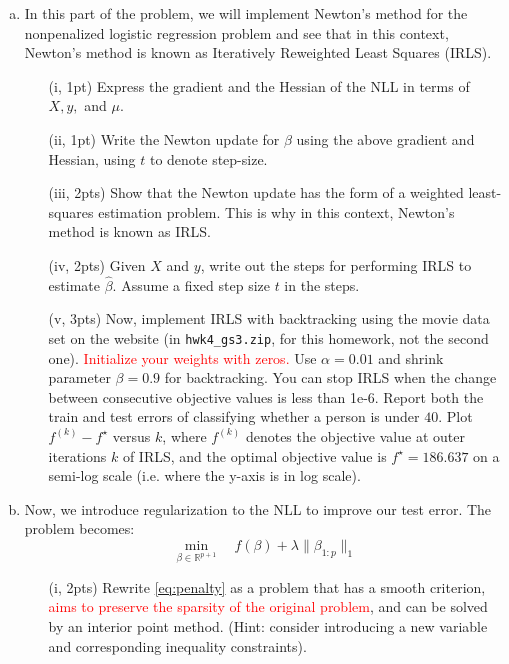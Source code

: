\documentclass{article}
\theoremstyle{remark}
\theoremstyle{definition}
\begin{document}
\begin{enumerate}[(a)]
    \item In this part of the problem, we will implement Newton's method for the nonpenalized logistic regression problem and see that in this context, Newton's method is known as Iteratively Reweighted Least Squares (IRLS).
        \begin{enumerate}
    	\item[(i, 1pt)] Express the gradient and the Hessian of the NLL in terms of $X,y,$ and $\mu$.
    	\item[(ii, 1pt)] Write the Newton update for $\beta$ using the above gradient and Hessian, using $t$ to denote step-size.
    	\item[(iii, 2pts)] Show that the Newton update has the form of a weighted least-squares estimation problem. This is why in this context, Newton's method is known as IRLS.
    	\item[(iv, 2pts)] Given $X$ and $y$, write out the steps for performing IRLS to estimate $\hat{\beta}$. Assume a fixed step size $t$ in the steps.
        \item[(v, 3pts)] Now, implement IRLS with backtracking using the movie data set on the website (in \texttt{hwk4\_gs3.zip}, for this homework, not the second one). \textcolor{red}{Initialize your weights with zeros.} Use $\alpha = 0.01$ and shrink parameter $\beta = 0.9$ for backtracking. You can stop IRLS when the change between consecutive objective values is less than 1e-6. Report both the train and test errors of classifying whether a person is under $40$. Plot $f^{(k)} - f^{\star}$ versus $k$,  where $f^{(k)}$ denotes the objective value at outer iterations $k$ of IRLS, and the optimal objective value is $f^\star = 186.637$ on a semi-log scale (i.e. where the y-axis is in log scale).
        \end{enumerate}
    \item Now, we introduce regularization to the NLL to improve our test error. The problem becomes:
    \begin{equation}
		\min_{\beta \in \mathbb{R}^{p+1}} \quad f(\beta) + \lambda\|\beta_{1:p}\|_1
	\label{eq:penalty}
	\end{equation}
	    \begin{enumerate}
	    \item[(i, 2pts)] Rewrite \eqref{eq:penalty} as a problem that has a smooth criterion, \textcolor{red}{aims to preserve the sparsity of the original problem}, and can be solved by an interior point method. (Hint: consider introducing a new variable and corresponding inequality constraints).

\end{enumerate}
\end{enumerate}
\end{document}
